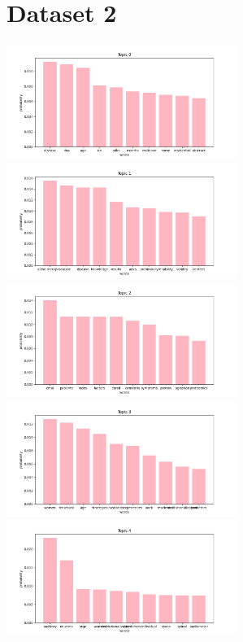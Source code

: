 \documentclass[10pt]{article} %
\begin{document}
	\section{Dataset 2}
	\begin{center}
		\includegraphics[width=7.5cm]{images/plots/test_8_no_stopwords_dataset_2/topic_0.png}
		\includegraphics[width=7.5cm]{images/plots/test_8_no_stopwords_dataset_2/topic_1.png}
		\includegraphics[width=7.5cm]{images/plots/test_8_no_stopwords_dataset_2/topic_2.png}
		\includegraphics[width=7.5cm]{images/plots/test_8_no_stopwords_dataset_2/topic_3.png}\
		\includegraphics[width=7.5cm]{images/plots/test_8_no_stopwords_dataset_2/topic_4.png}

\end{center}
\end{document}
